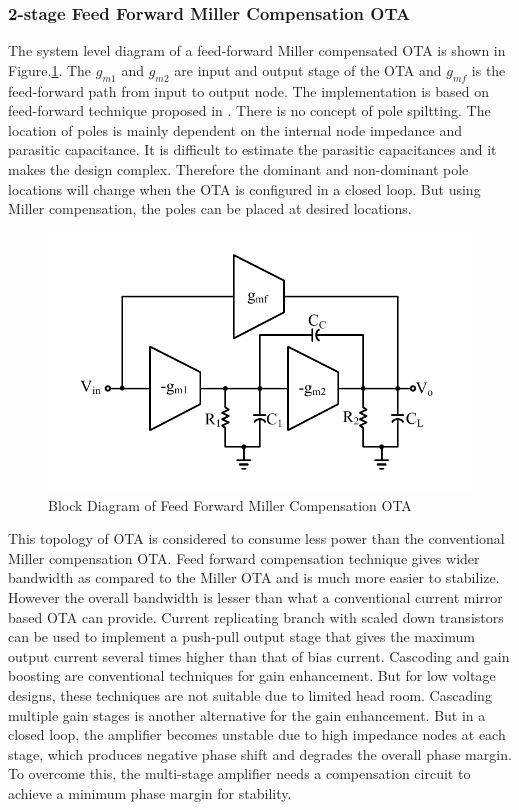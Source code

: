 \subsubsection{2-stage Feed Forward Miller Compensation OTA}

The system level diagram of a feed-forward Miller compensated OTA is shown in Figure.\ref{fig:FFMCO}. The $g_{m1}$ and $g_{m2}$ are input and output stage of the OTA and $g_{mf}$ is the feed-forward path from input to output node. The implementation is based on feed-forward technique proposed in \cite{feed_fwd_miller}. There is no concept of pole spiltting. The location of poles is mainly dependent on the internal node impedance and parasitic capacitance. It is difficult to estimate the parasitic capacitances and it makes the design complex. Therefore the dominant and non-dominant pole locations will change when the OTA is configured in a closed loop. But using Miller compensation, the poles can be placed at desired locations.

\begin{figure} [H]
\centering
\includegraphics[scale=1]{Figures/Misc/PDFs/FFMCO.pdf}
\caption{Block Diagram of Feed Forward Miller Compensation OTA}
\label{fig:FFMCO}
\end{figure}

This topology of OTA is considered to consume less power than the conventional Miller compensation OTA. Feed forward compensation technique gives wider bandwidth as compared to the Miller OTA and is much more easier to stabilize.  However the overall bandwidth is lesser than what a conventional current mirror based OTA can provide. Current replicating branch with scaled down transistors can be used to implement a push-pull output stage that gives the maximum output current several times higher than that of bias current. Cascoding and gain boosting are conventional techniques for gain enhancement. But for low voltage designs, these techniques are not suitable due to limited head room. Cascading multiple gain stages is another alternative for the gain enhancement. But in a closed loop, the amplifier becomes unstable due to high impedance nodes at each stage, which produces negative phase shift and degrades the overall phase margin. To overcome this, the multi-stage amplifier needs a compensation circuit to achieve a minimum phase margin for stability.

